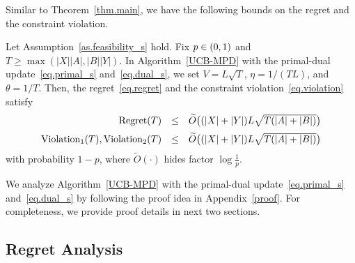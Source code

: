 \documentclass[12pt, final]{l4dc2023}
\begin{document}
Similar to Theorem~\ref{thm.main}, we have the following bounds on the regret and the constraint violation.

\begin{theorem}\label{thm.main_s}
	Let Assumption~\ref{as.feasibility_s} hold. 
	Fix $p\in\rbr{0,1}$ and $T\geq \max(|X||A|,|B||Y|)$. 
	In Algorithm~\ref{UCB-MPD} with the primal-dual update~\eqref{eq.primal_s} and~\eqref{eq.dual_s}, we set
	$V=L\sqrt{T}$, $\eta = 1/(TL)$, and $\theta = 1/T$.
	Then, the regret~\eqref{eq.regret} and the constraint violation~\eqref{eq.violation} satisfy 
	\[
	\begin{array}{rcl}
	\text{\normalfont Regret}(T) & \leq & 
	\tilde O \big( (|X|+|Y|) L \sqrt{T(|A|+|B|)} \big)
	\\[0.2cm]
	\text{\normalfont Violation}_1(T), \text{\normalfont Violation}_2(T) & \leq & 
	\tilde O \big( (|X|+|Y|) L \sqrt{T(|A|+|B|)} \big)
	\end{array}
	\]
	with probability $1-p$, where $\tilde O(\cdot)$ hides factor $\log\tfrac{1}{p}$.
\end{theorem}

We analyze Algorithm~\ref{UCB-MPD} with the primal-dual update~\eqref{eq.primal_s} and~\eqref{eq.dual_s} by following the proof idea in Appendix~\ref{proof}. For completeness, we provide proof details in next two sections.

\subsection{Regret Analysis}
\end{document}
